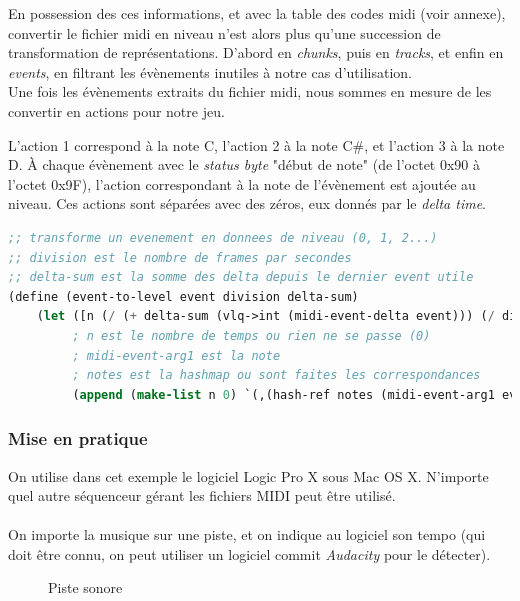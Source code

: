 En possession des ces informations, et avec la table des codes midi (voir annexe), convertir le fichier midi en niveau n'est alors plus qu'une succession de transformation de représentations. D'abord en \textit{chunks}, puis en \textit{tracks}, et enfin en \textit{events}, en filtrant les évènements inutiles à notre cas d'utilisation.\\
Une fois les évènements extraits du fichier midi, nous sommes en mesure de les convertir en actions pour notre jeu.

L'action 1 correspond à la note C, l'action 2 à la note C\#, et l'action 3 à la note D.
À chaque évènement avec le \textit{status byte} "début de note" (de l'octet 0x90 à l'octet 0x9F), l'action correspondant à la note de l'évènement est ajoutée au niveau. Ces actions sont séparées avec des zéros, eux donnés par le \textit{delta time}.\\

\begin{lstlisting}[language=Lisp]
;; transforme un evenement en donnees de niveau (0, 1, 2...)
;; division est le nombre de frames par secondes
;; delta-sum est la somme des delta depuis le dernier event utile
(define (event-to-level event division delta-sum)
    (let ([n (/ (+ delta-sum (vlq->int (midi-event-delta event))) (/ division 4))])
         ; n est le nombre de temps ou rien ne se passe (0)
         ; midi-event-arg1 est la note
         ; notes est la hashmap ou sont faites les correspondances
         (append (make-list n 0) `(,(hash-ref notes (midi-event-arg1 event) ?)))))
\end{lstlisting}


\subsubsection{Mise en pratique}
On utilise dans cet exemple le logiciel Logic Pro X sous Mac OS X. N'importe quel autre séquenceur gérant les fichiers MIDI peut être utilisé.\\

\paragraph{}
On importe la musique sur une piste, et on indique au logiciel son tempo (qui doit être connu, on peut utiliser un logiciel commit \textit{Audacity} pour le détecter).

\begin{figure}[H]\centering
  \caption{Piste sonore}
  \label{transitions_scenes}
\end{figure}

